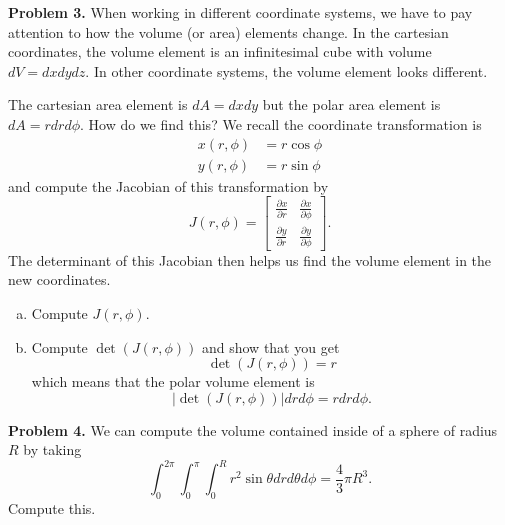 \documentclass[12pt]{report} %
\theoremstyle{definition}
\begin{document}
\noindent\textbf{Problem 3.} When working in different coordinate systems, we have to pay attention to how the volume (or area) elements change.  In the cartesian coordinates, the volume element is an infinitesimal cube with volume $dV=dxdydz$.  In other coordinate systems, the volume element looks different.  

The cartesian area element is $dA=dxdy$ but the polar area element is $dA=rdrd\phi$. How do we find this? We recall the coordinate transformation is
    \begin{align*}
        x(r,\phi)&=r\cos \phi\\
        y(r,\phi)&=r\sin \phi
    \end{align*}
    and compute the Jacobian of this transformation by
    \[
    J(r,\phi)=\begin{bmatrix} \frac{\partial x}{\partial r} & \frac{\partial x}{\partial \phi} \\ \frac{\partial y}{\partial r} & \frac{\partial y}{\partial \phi}\end{bmatrix}.
    \]
    The determinant of this Jacobian then helps us find the volume element in the new coordinates.
\begin{enumerate}[(a)]
    \item Compute $J(r,\phi)$.
    \item Compute $\det(J(r,\phi))$ and show that you get 
    \[
    \det(J(r,\phi))=r
    \]
    which means that the polar volume element is
    \[
    |\det(J(r,\phi))|drd\phi = rdrd\phi.
    \]
\end{enumerate}
\vspace*{.5cm}

\noindent\textbf{Problem 4.} We can compute the volume contained inside of a sphere of radius $R$ by taking
\[
\int_0^{2\pi} \int_0^\pi \int_0^R r^2 \sin \theta dr d\theta d\phi = \frac{4}{3}\pi R^3.
\]
Compute this.
\end{document}
